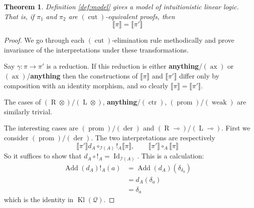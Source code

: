 \documentclass[12pt]{article}
\theoremstyle{plain}
\newtheorem{thm}{Theorem}[subsection] %
\theoremstyle{definition}
\newcommand{\call}[1]{\mathcal{#1}}
\newcommand{\lto}{\longrightarrow}
\newcommand{\rtensor}{(\operatorname{R}\otimes)}
\newcommand{\ltensor}{(\operatorname{L}\otimes)}
\newcommand{\prom}{(\operatorname{prom})}
\newcommand{\ctr}{(\operatorname{ctr})}
\newcommand{\der}{(\operatorname{der})}
\newcommand{\weak}{(\operatorname{weak})}
\newcommand{\cut}{(\operatorname{cut})}
\newcommand{\ax}{(\operatorname{ax})}
\begin{document}
\begin{thm}
Definition \ref{def:model} gives a model of intuitionistic linear logic. That is, if $\pi_1$ and $\pi_2$ are $\cut$-equivalent proofs, then
\begin{equation}
\llbracket \pi \rrbracket = \llbracket \pi' \rrbracket
\end{equation}
\end{thm}
\begin{proof}
We go through each $\cut$-elimination rule methodically and prove invariance of the interpretations under these transformations.

Say $\gamma: \pi \lto \pi'$ is a reduction. If this reduction is either \textbf{anything}/$\ax$ or $\ax$/\textbf{anything} then the constructions of $\llbracket \pi \rrbracket$ and $\llbracket \pi' \rrbracket$ differ only by composition with an identity morphism, and so clearly $\llbracket \pi \rrbracket = \llbracket \pi' \rrbracket$.

The cases of $\rtensor/\ltensor$, \textbf{anything}/$\ctr$, $\prom/\weak$ are similarly trivial.

The interesting cases are $\prom/\der$ and $(\operatorname{R}\multimap)$/$(\operatorname{L}\multimap)$. First we consider $\prom/\der$. The two interpretations are respectively
\begin{equation}
\llbracket \pi' \rrbracket d_A \circ_{\call{I}(A)} !_A \llbracket \pi \rrbracket,\qquad \llbracket \pi ' \rrbracket \circ_A \llbracket \pi \rrbracket
\end{equation}
So it suffices to show that $d_A \circ !_A = \operatorname{Id}_{\call{I}(A)}$. This is a calculation:
\begin{align*}
\operatorname{Add}(d_A)!_A(a) &= \operatorname{Add}(d_A)(\delta_{\delta_a})\\
&= d_A(\delta_a)\\
&= \delta_a
\end{align*}
which is the identity in $\operatorname{Kl}(\call{Q})$.


\end{proof}
\end{document}
